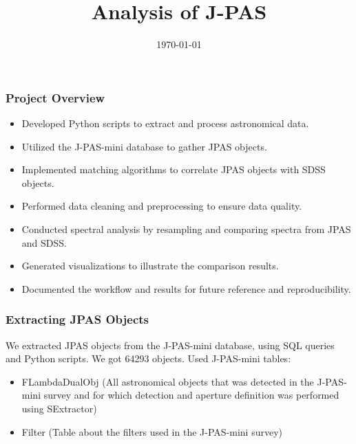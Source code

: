 \documentclass{beamer}
\title{Analysis of J-PAS}
\date{\today}
\newcommand{\mycomment}[1]{}
\begin{document}
\frame{\titlepage}

\mycomment{
\begin{frame}
\frametitle{Slide Title}
Steps:
\begin{itemize}
    \item Extracted JPAS objects from the J-PAS-mini database 
    \item Mathced with the SDSS objects (short description of the matching process)
    \item Selected the objects with spectum in the SDSS database
    \item Resampled the JPAS and the SDSS specta to the same wavelength grid. (short description of the resampling process)
    \item Compared the JPAS and the SDSS spectra (short description of the comparison results)
    \item Future work: (short description of the future work)
\end{itemize}

insert numbers of JPAS objects, SDSS objects, and the number of matched objects
objects with spectra in the SDSS database

\end{frame}
}

\begin{frame}
\frametitle{Project Overview}
\begin{itemize}
    \item Developed Python scripts to extract and process astronomical data.
    \item Utilized the J-PAS-mini database to gather JPAS objects.
    \item Implemented matching algorithms to correlate JPAS objects with SDSS objects.
    \item Performed data cleaning and preprocessing to ensure data quality.
    \item Conducted spectral analysis by resampling and comparing spectra from JPAS and SDSS.\@
    \item Generated visualizations to illustrate the comparison results.
    \item Documented the workflow and results for future reference and reproducibility.
\end{itemize}
\end{frame}

\begin{frame}
\frametitle{Extracting JPAS Objects}
    We extracted JPAS objects from the J-PAS-mini database, using SQL queries and Python scripts. We got 64293 objects.
    Used J-PAS-mini tables: 
    \begin{itemize}
        \item FLambdaDualObj (All astronomical objects that was detected in the J-PAS-mini survey and for which detection and aperture definition was performed using SExtractor)
        \item Filter (Table about the filters used in the J-PAS-mini survey)
    \end{itemize}
\end{frame}
\end{document}

